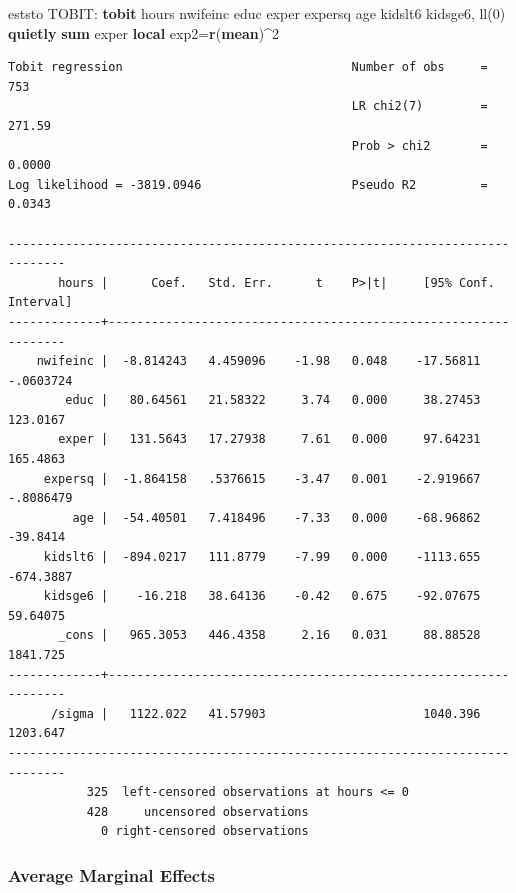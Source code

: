 \documentclass[
]{book}
\newenvironment{Shaded}{\begin{snugshade}}{\end{snugshade}}
\newcommand{\FunctionTok}[1]{\textcolor[rgb]{0.13,0.29,0.53}{\textbf{#1}}}
\newcommand{\KeywordTok}[1]{\textcolor[rgb]{0.13,0.29,0.53}{\textbf{#1}}}
\newcommand{\NormalTok}[1]{#1}
\begin{document}
\begin{Shaded}
\begin{Highlighting}[]
\NormalTok{eststo TOBIT: }\KeywordTok{tobit}\NormalTok{ hours nwifeinc educ exper expersq age kidslt6 kidsge6, ll(0)}
\KeywordTok{quietly} \KeywordTok{sum}\NormalTok{ exper}
\KeywordTok{local}\NormalTok{ exp2=}\FunctionTok{r}\NormalTok{(}\KeywordTok{mean}\NormalTok{)\^{}2}
\end{Highlighting}
\end{Shaded}

\begin{verbatim}
Tobit regression                                Number of obs     =        753
                                                LR chi2(7)        =     271.59
                                                Prob > chi2       =     0.0000
Log likelihood = -3819.0946                     Pseudo R2         =     0.0343

------------------------------------------------------------------------------
       hours |      Coef.   Std. Err.      t    P>|t|     [95% Conf. Interval]
-------------+----------------------------------------------------------------
    nwifeinc |  -8.814243   4.459096    -1.98   0.048    -17.56811   -.0603724
        educ |   80.64561   21.58322     3.74   0.000     38.27453    123.0167
       exper |   131.5643   17.27938     7.61   0.000     97.64231    165.4863
     expersq |  -1.864158   .5376615    -3.47   0.001    -2.919667   -.8086479
         age |  -54.40501   7.418496    -7.33   0.000    -68.96862    -39.8414
     kidslt6 |  -894.0217   111.8779    -7.99   0.000    -1113.655   -674.3887
     kidsge6 |    -16.218   38.64136    -0.42   0.675    -92.07675    59.64075
       _cons |   965.3053   446.4358     2.16   0.031     88.88528    1841.725
-------------+----------------------------------------------------------------
      /sigma |   1122.022   41.57903                      1040.396    1203.647
------------------------------------------------------------------------------
           325  left-censored observations at hours <= 0
           428     uncensored observations
             0 right-censored observations
\end{verbatim}

\subsubsection*{Average Marginal Effects}\label{average-marginal-effects}
\end{document}
